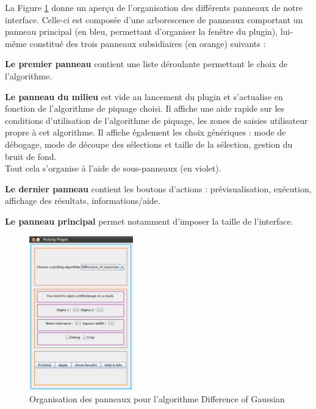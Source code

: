 La Figure \ref{panneaux} donne un aperçu de l'organisation des différents panneaux de notre interface. Celle-ci est composée d'une arborescence de panneaux comportant un panneau principal (en bleu, permettant d'organiser la fenêtre du plugin), lui-m\^eme constitué des trois panneaux subsidiaires (en orange) suivants :
\begin{description}
\item \textbf{Le premier panneau} contient une liste déroulante permettant le choix de l'algorithme. 
\item \textbf{Le panneau du milieu} est vide au lancement du plugin et s'actualise en fonction de l'algorithme de piquage choisi. Il affiche une aide rapide sur les conditions d'utilisation de l'algorithme de piquage, les zones de saisies utilisateur propre à cet algorithme. Il affiche également les choix génériques : mode de débogage, mode de découpe des sélections et taille de la sélection, gestion du bruit de fond. \\
Tout cela s'organise à l'aide de sous-panneaux (en violet).
\item \textbf{Le dernier panneau} contient les boutons d'actions : prévisualisation, exécution, affichage des résultats, informations/aide.
\item \textbf{Le panneau principal} permet notamment d'imposer la taille de l'interface.
\end{description}

\begin{figure}[!h] 
\begin{center}
\includegraphics[width=0.4\textwidth]{pluginCadres.png}
\caption{Organisation des panneaux pour l'algorithme Difference of Gaussian}
\label{panneaux}
\end{center}
\end{figure}
\pagebreak

